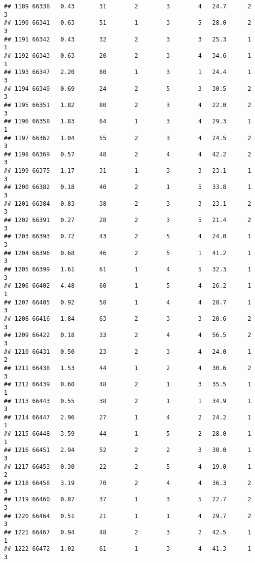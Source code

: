 \documentclass[
]{article}
\begin{document}
\begin{verbatim}
## 1189 66338   0.43       31        2        3        4   24.7      2      3
## 1190 66341   0.63       51        1        3        5   28.0      2      3
## 1191 66342   0.43       32        2        3        3   25.3      1      1
## 1192 66343   0.63       20        2        3        4   34.6      1      1
## 1193 66347   2.20       80        1        3        1   24.4      1      3
## 1194 66349   0.69       24        2        5        3   30.5      2      3
## 1195 66351   1.82       80        2        3        4   22.0      2      3
## 1196 66358   1.83       64        1        3        4   29.3      1      1
## 1197 66362   1.04       55        2        3        4   24.5      2      3
## 1198 66369   0.57       48        2        4        4   42.2      2      3
## 1199 66375   1.17       31        1        3        3   23.1      1      3
## 1200 66382   0.18       40        2        1        5   33.8      1      3
## 1201 66384   0.83       38        2        3        3   23.1      2      3
## 1202 66391   0.27       28        2        3        5   21.4      2      3
## 1203 66393   0.72       43        2        5        4   24.0      1      3
## 1204 66396   0.68       46        2        5        1   41.2      1      3
## 1205 66399   1.61       61        1        4        5   32.3      1      3
## 1206 66402   4.48       60        1        5        4   26.2      1      1
## 1207 66405   0.92       58        1        4        4   28.7      1      3
## 1208 66416   1.84       63        2        3        3   20.6      2      3
## 1209 66422   0.18       33        2        4        4   56.5      2      3
## 1210 66431   0.50       23        2        3        4   24.0      1      2
## 1211 66438   1.53       44        1        2        4   30.6      2      3
## 1212 66439   0.60       48        2        1        3   35.5      1      1
## 1213 66443   0.55       38        2        1        1   34.9      1      3
## 1214 66447   2.96       27        1        4        2   24.2      1      1
## 1215 66448   3.59       44        1        5        2   28.0      1      1
## 1216 66451   2.94       52        2        2        3   30.0      1      3
## 1217 66453   0.30       22        2        5        4   19.0      1      2
## 1218 66458   3.19       70        2        4        4   36.3      2      3
## 1219 66460   0.87       37        1        3        5   22.7      2      3
## 1220 66464   0.51       21        1        1        4   29.7      2      3
## 1221 66467   0.94       48        2        3        2   42.5      1      1
## 1222 66472   1.02       61        1        3        4   41.3      1      3

\end{verbatim}
\end{document}
